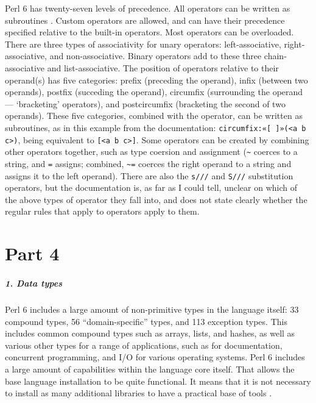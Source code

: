 \documentclass[14pt,english]{extarticle}
\begin{document}
Perl 6 has twenty-seven levels of precedence. All operators can be
written as subroutines \cite{Documentation}. Custom operators are
allowed, and can have their precedence specified relative to the built-in
operators. Most operators can be overloaded. There are three types
of associativity for unary operators: left-associative, right-associative,
and non-associative. Binary operators add to these three chain-associative
and list-associative. The position of operators relative to their
operand(s) has five categories: prefix (preceding the operand), infix
(between two operands), postfix (succeding the operand), circumfix
(surrounding the operand — `bracketing' operators), and postcircumfix
(bracketing the second of two operands). These five categories, combined
with the operator, can be written as subroutines, as in this example
from the documentation: \texttt{circumfix:«{[} {]}»(<a b c>)}, being
equivalent to \texttt{{[}<a b c>{]}}. Some operators can be created
by combining other operators together, such as type coersion and assignment
(\texttt{\textasciitilde{}} coerces to a string, and \texttt{=} assigns;
combined, \texttt{\textasciitilde{}=} coerces the right operand to
a string and assigns it to the left operand). There are also the \texttt{s///}
and \texttt{S///} substitution operators, but the documentation is,
as far as I could tell, unclear on which of the above types of operator
they fall into, and does not state clearly whether the regular rules
that apply to operators apply to them.


\part*{Part 4}


\subsubsection*{1. Data types}

Perl 6 includes a large amount of non-primitive types in the language
itself: 33 compound types, 56 ``domain-specific'' types, and 113
exception types. This includes common compound types such as arrays,
lists, and hashes, as well as various other types for a range of applications,
such as for documentation, concurrent programming, and I/O for various
operating systems. Perl 6 includes a large amount of capabilities
within the language core itself. That allows the base language installation
to be quite functional. It means that it is not necessary to install
as many additional libraries to have a practical base of tools \cite{Documentation}.
\end{document}
